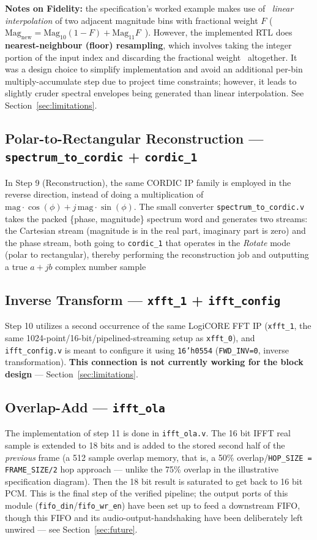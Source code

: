 \documentclass[conference,a4paper]{IEEEtran}
\begin{document}
\textbf{Notes on Fidelity:} the specification's worked example makes use of \
\textit{linear interpolation} of two adjacent magnitude bins with fractional weight $F$
(\ $\text{Mag}_{\text{new}} = \text{Mag}_{10}(1-F) + \text{Mag}_{11}F$\ ).
However, the implemented RTL does \textbf{nearest-neighbour (floor) resampling}, which involves
taking the integer portion of the input index and discarding the fractional weight \
altogether. It was a design choice to simplify implementation and avoid an additional
per-bin multiply-accumulate step due to project time constraints; however, it leads to
slightly cruder spectral envelopes being generated than linear interpolation. See
Section~\ref{sec:limitations}.

\subsection{Polar-to-Rectangular Reconstruction --- \texttt{spectrum\_to\_cordic} + \texttt{cordic\_1}}
In Step 9 (Reconstruction), the same CORDIC IP family is employed in the reverse direction,
instead of doing a multiplication of $\text{mag}\cdot\cos(\phi) + j\,\text{mag}\cdot\sin(\phi)$.
The small converter \texttt{spectrum\_to\_cordic.v} takes the packed \{phase, magnitude\}
spectrum word and generates two streams: the Cartesian stream (magnitude is in the real part,
imaginary part is zero) and the phase stream, both going to \texttt{cordic\_1} that operates
in the \textit{Rotate} mode (polar to rectangular), thereby performing the reconstruction job
and outputting a true $a+jb$ complex number sample

\subsection{Inverse Transform --- \texttt{xfft\_1} + \texttt{ifft\_config}}
Step 10 utilizes a second occurrence of the same LogiCORE FFT IP (\texttt{xfft\_1}, the same 1024-point/16-bit/pipelined-streaming setup as \texttt{xfft\_0}), and \texttt{ifft\_config.v} is meant to configure it using \texttt{16'h0554} (\texttt{FWD\_INV=0}, inverse transformation). \textbf{This connection is not currently working for the block design} ---
Section~\ref{sec:limitations}.

\subsection{Overlap-Add --- \texttt{ifft\_ola}}
The implementation of step 11 is done in \texttt{ifft\_ola.v}. The 16 bit IFFT real sample is
extended to 18 bits and is added to the stored second half of the \emph{previous} frame (a 512 sample overlap memory,
that is, a 50\% overlap/\texttt{HOP\_SIZE = FRAME\_SIZE/2} hop approach --- unlike the 75\% overlap in the illustrative 
specification diagram). Then the 18 bit result is saturated to get back to 16 bit PCM. This is the final step of the verified 
pipeline; the output ports of this module (\texttt{fifo\_din}/\texttt{fifo\_wr\_en}) have been set up to feed a downstream FIFO,
though this FIFO and its audio-output-handshaking have been deliberately left unwired --- see
Section~\ref{sec:future}.
\end{document}
